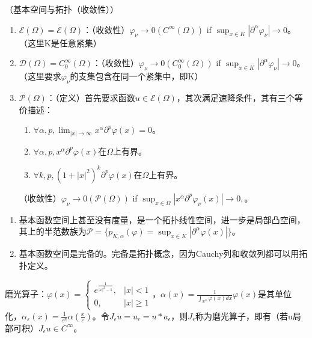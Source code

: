 \begin{df}（基本空间与拓扑（收敛性））

  \begin{enumerate}[(1).]
    \item $\mathscr{E}(\Omega) = \mathscr{E}(\Omega)$：（收敛性）$\varphi_{\nu} \rightarrow 0\left(C^{\infty}\left(\Omega\right)\right)$ if $\sup _{x \in K}\left|\partial^{\alpha} \varphi_{\nu}\right| \rightarrow 0$。（这里K是任意紧集）
    \item $\mathscr{D}(\Omega) = C^{\infty}_0(\Omega)$：（收敛性）$\varphi_{\nu} \rightarrow 0\left(C^{\infty}_0\left(\Omega\right)\right)$ if $\sup _{x \in K}\left|\partial^{\alpha} \varphi_{\nu}\right| \rightarrow 0$。（这里要求$\varphi_{\nu}$的支集包含在同一个紧集中，即K）
    \item $\mathscr{P}(\Omega)$：（定义）首先要求函数$u \in \mathscr{E}(\Omega)$，其次满足速降条件，其有三个等价描述：
    \begin{enumerate}[1.]
      \item $\forall \alpha, p, \lim _{|x| \rightarrow \infty} x^{\alpha} \partial^{p} \varphi(x)=0$。
      \item $\forall \alpha, p, x^{\alpha} \partial^{p} \varphi(x)$在$\Omega$上有界。
      \item $\forall k, p, (1 + |x|^2)^k \partial^{p} \varphi(x)$在$\Omega$上有界。
    \end{enumerate}
    （收敛性）$\varphi_{\nu} \rightarrow 0\left(\mathscr{P}\left(\Omega\right)\right)$ if $\sup_{x \in \Omega}\left|x^{\alpha} \partial^{p} \varphi_{\nu}(x)\right| \rightarrow 0, $。
  \end{enumerate}
\end{df}

\begin{rmk}
  \begin{enumerate}
    \item 基本函数空间上甚至没有度量，是一个拓扑线性空间，进一步是局部凸空间，其上的半范数族为$\mathcal{P} = \{ p_{K, \alpha}(\varphi) = \sup_{x \in K}\left|\partial^{\alpha} \varphi(x) \right|\}$。
    \item 基本函数空间是完备的。完备是拓扑概念，因为Cauchy列和收敛列都可以用拓扑定义。
  \end{enumerate}
\end{rmk}

\begin{df}
  磨光算子：$\varphi(x)=\left\{\begin{array}{ll}
    e^{\frac{1}{|x|^{2}-1}}, & |x|<1 \\
    0, & |x| \geqslant 1
  \end{array}\right.$，$\alpha(x)=\frac{1}{\int_{\mathbb{R}^n} \varphi(x) dx} \varphi(x)$是其单位化，$\alpha_{\varepsilon}(x)=\frac{1}{\varepsilon^{n}} \alpha\left(\frac{x}{\varepsilon}\right)$。令$J_{\epsilon} u = u_{\epsilon} = u * a_{\epsilon}$，则$J_{\epsilon}$称为磨光算子，即有（若u局部可积）$J_{\epsilon} u \in C^{\infty}$。
\end{df}

